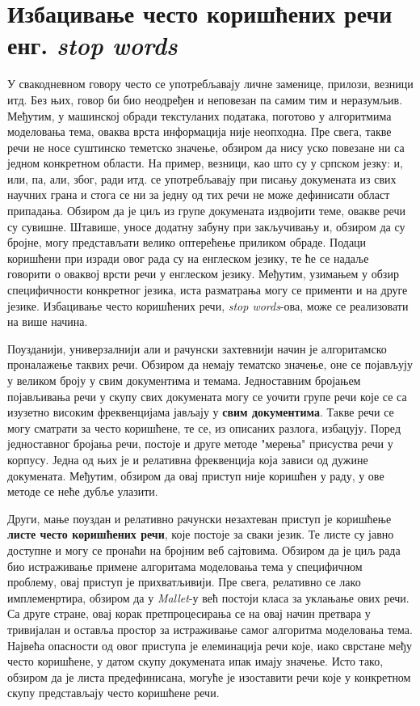 \section{Избацивање често коришћених речи енг. \textit{stop words}}
		
У свакодневном говору често се употребљавају личне заменице, прилози, везници итд. Без њих, говор би био неодређен и неповезан па самим тим и неразумљив. Међутим, у машинској обради текстуланих података, поготово у алгоритмима моделовања тема, оваква врста информација није неопходна. Пре свега, такве  речи не носе суштинско теметско значење, обзиром да нису уско повезане ни са једном конкретном области. На пример, везници, као што су у српском језку: и, или, па, али, због, ради итд. се употребљавају при писању докумената из свих научних грана и стога се ни за једну од тих речи не може дефинисати област припадања. Обзиром да је циљ из групе докумената издвојити теме, овакве речи су сувишне. Штавише, уносе додатну забуну при закључивању и, обзиром да су бројне, могу представљати велико оптерећење приликом обраде.	
Подаци коришћени при изради овог рада су на енглеском језику, те ће се надаље говорити о оваквој врсти речи у енглеском језику. Међутим, узимањем у обзир специфичности конкретног језика, иста разматрања могу се применти и на друге језике. Избацивање често коришћених речи, \textit{stop words}-ова, може се реализовати на више начина. 

Поузданији, универзалнији али и рачунски захтевнији начин је алгоритамско проналажење таквих речи. Обзиром да немају тематско значење, оне се појављују у великом броју у свим документима и темама. Једноставним бројањем појављивања речи у скупу свих докумената могу се уочити групе речи које се са изузетно високим фреквенцијама јављају у \textbf{свим документима}. Такве речи се могу сматрати за често коришћене, те се, из описаних разлога, избацују.  Поред једноставног бројања речи, постоје и друге методе "мерења" присуства речи у корпусу. Једна од њих је и релативна фреквенција која зависи од дужине докумената. Међутим, обзиром да овај приступ није коришћен у раду, у ове методе се неће дубље улазити.

Други, мање поуздан и релативно рачунски незахтеван приступ је коришћење \textbf{листе често коришћених речи}, које постоје за сваки језик. Те листе су јавно доступне и могу се пронаћи на бројним веб сајтовима. Обзиром да је циљ рада био истраживање примене алгоритама моделовања тема у специфичном проблему, овај приступ је прихватљивији. Пре свега, релативно се лако имплеменртира, обзиром да у \textit{Mallet}-у већ постоји класа за уклањање ових речи. Са друге стране, овај корак претпроцесирања се на овај начин претвара у тривијалан и оставља простор за истраживање самог алгоритма моделовања тема. 
Највећа опасности од овог приступа је елеминација речи које, иако сврстане међу често коришћене, у датом скупу докумената ипак имају значење. Исто тако, обзиром да је листа предефинисана, могуће је изоставити речи које у конкретном скупу представљају често коришћене речи.

